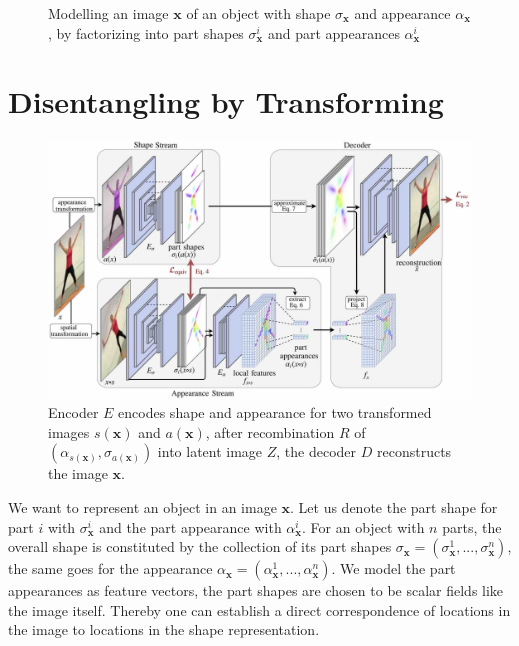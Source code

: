 	\begin{figure}[htp]
		\centering
		
		\caption{Modelling an image $\mathbf{x}$ of an object with shape ${\sigma}_{\mathbf{x}}$ and appearance $\alpha_{\mathbf{x}}$, by factorizing into part shapes ${{\sigma}}^i_{\mathbf{x}}$ and part appearances ${\alpha}^i_{\mathbf{x}}$}
		\label{fig:representation}
	\end{figure}

\section{Disentangling by Transforming}\label{sec:framework}
	\begin{figure}[t]
		\centering
		\includegraphics[trim={0cm 0cm 0cm 0cm},clip, width=1.\linewidth]{fig/other/architecture_final}
		\caption{Encoder $E$ encodes shape and appearance for two transformed images $s(\mathbf{x})$ and $a(\mathbf{x})$, after recombination $R$ of $({\alpha}_{s(\mathbf{x})}, {\sigma}_{a(\mathbf{x})})$ into latent image $Z$, the decoder $D$ reconstructs the image $\mathbf{x}$.}
		\label{fig:architecture}
	\end{figure}
	We want to represent an object in an image $\mathbf{x}$. Let us denote the part shape for part $i$ with ${\sigma}^i_\mathbf{x}$ and the part appearance with ${\alpha}^i_\mathbf{x}$. For an object with $n$ parts, the overall shape is constituted by the collection of its part shapes ${\sigma}_\mathbf{x} =  ({\sigma}^1_\mathbf{x}, ...,  {\sigma}^n_\mathbf{x})$, the same goes for the appearance ${\alpha}_\mathbf{x} =  (\alpha^1_\mathbf{x}, ...,  \alpha^n_\mathbf{x})$. We model the part appearances as feature vectors, the part shapes are chosen to be scalar fields like the image itself. Thereby one can establish a direct correspondence of locations in the image to locations in the shape representation.\\
